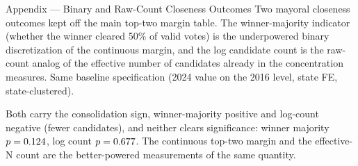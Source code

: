 
\begin{frame}{Appendix --- Binary and Raw-Count Closeness Outcomes}
\hypertarget{app:compbinary}{}
\small
Two mayoral closeness outcomes kept off the main top-two margin table. The winner-majority indicator (whether the winner cleared 50\% of valid votes) is the underpowered binary discretization of the continuous margin, and the log candidate count is the raw-count analog of the effective number of candidates already in the concentration measures. Same baseline specification (2024 value on the 2016 level, state FE, state-clustered).
\smallskip
\begin{center}
\scriptsize
\resizebox{0.6\linewidth}{!}{}
\end{center}
\smallskip
\footnotesize Both carry the consolidation sign, winner-majority positive and log-count negative (fewer candidates), and neither clears significance: winner majority $p=0.124$, log count $p=0.677$. The continuous top-two margin and the effective-N count are the better-powered measurements of the same quantity. \hfill\hyperlink{src:spine1}{}
\end{frame}
